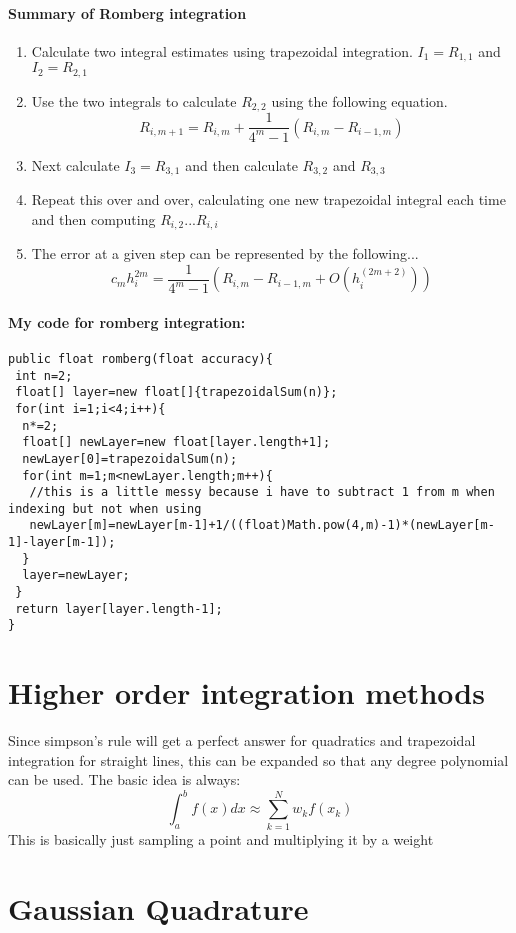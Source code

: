 \documentclass{report}
\begin{document}
\paragraph{Summary of Romberg integration}
\begin{enumerate}
	\item Calculate two integral estimates using trapezoidal integration. $I_1=R_{1,1}$ and $I_2=R_{2,1}$
	\item Use the two integrals to calculate $R_{2,2}$ using the following equation.
	\[R_{i,m+1}=R_{i,m}+\frac1{4^m-1}(R_{i,m}-R_{i-1,m})\]
	\item Next calculate $I_3=R_{3,1}$ and then calculate $R_{3,2}$ and $R_{3,3}$
	\item Repeat this over and over, calculating one new trapezoidal integral each time and then computing $R_{i,2} ... R_{i,i}$
	\item The error at a given step can be represented by the following...
	\[c_mh_i^{2m}=\frac1{4^m-1}(R_{i,m}-R_{i-1,m}+O(h_i^(2m+2)))\]
\end{enumerate}
\paragraph{My code for romberg integration:}
\begin{verbatim}
public float romberg(float accuracy){
 int n=2;
 float[] layer=new float[]{trapezoidalSum(n)};
 for(int i=1;i<4;i++){
  n*=2;
  float[] newLayer=new float[layer.length+1];
  newLayer[0]=trapezoidalSum(n);
  for(int m=1;m<newLayer.length;m++){
   //this is a little messy because i have to subtract 1 from m when indexing but not when using 
   newLayer[m]=newLayer[m-1]+1/((float)Math.pow(4,m)-1)*(newLayer[m-1]-layer[m-1]);
  }
  layer=newLayer;
 }
 return layer[layer.length-1];
}
\end{verbatim}

\section{Higher order integration methods}
Since simpson's rule will get a perfect answer for quadratics and trapezoidal integration for straight lines, this can be expanded so that any degree polynomial can be used. The basic idea is always:
\[\int_a^bf(x)dx\approx\sum_{k=1}^{N}w_kf(x_k)\]
This is basically just sampling a point and multiplying it by a weight
\section{Gaussian Quadrature}
\end{document}
